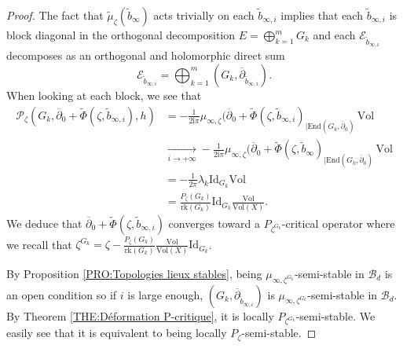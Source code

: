 \documentclass{article}
\theoremstyle{remark}
\theoremstyle{definition}
\newcommand{\tend}[2]{\underset{#1 \rightarrow #2}{\longrightarrow}}
\newcommand{\rk}{\mathrm{rk}}
\newcommand{\End}{\mathrm{End}}
\newcommand{\Vol}{\mathrm{Vol}}
\newcommand{\Id}{\mathrm{Id}}
\renewcommand{\i}{\boldsymbol{\mathrm{i}}}
\newcommand{\E}{\mathcal{E}}
\newcommand{\mB}{\mathcal{B}}
\newcommand{\mP}{\mathcal{P}}
\newcommand{\dbar}{\overline{\partial}}
\begin{document}
\begin{proof}
The fact that $\tilde{\mu}_\zeta(\tilde{b}_\infty)$ acts trivially on each $\tilde{b}_{\infty,i}$ implies that each $\tilde{b}_{\infty,i}$ is block diagonal in the orthogonal decomposition $E = \bigoplus_{k = 1}^m G_k$ and each $\E_{\tilde{b}_{\infty,i}}$ decomposes as an orthogonal and holomorphic direct sum
$$
\E_{\tilde{b}_{\infty,i}} = \bigoplus_{k = 1}^m (G_k,\dbar_{\tilde{b}_{\infty,i}}).
$$
When looking at each block, we see that
\begin{align*}
    \mP_\zeta(G_k,\dbar_0 + \tilde{\Phi}(\zeta,\tilde{b}_{\infty,i}),h) & = -\frac{1}{2\i\pi}\mu_{\infty,\zeta}(\dbar_0 + \tilde{\Phi}(\zeta,\tilde{b}_{\infty,i})_{|\End(G_k,\dbar_0)}\,\Vol\\
    & \tend{i}{+\infty} -\frac{1}{2\i\pi}\mu_{\infty,\zeta}(\dbar_0 + \tilde{\Phi}(\zeta,\tilde{b}_{\infty})_{|\End(G_k,\dbar_0)}\,\Vol\\
    & = -\frac{1}{2\pi}\lambda_k\Id_{G_k}\Vol\\
    & = \frac{P_\zeta(G_k)}{\rk(G_k)}\Id_{G_k}\frac{\Vol}{\Vol(X)}.
\end{align*}
We deduce that $\dbar_0 + \tilde{\Phi}(\zeta,\tilde{b}_{\infty,i})$ converges toward a $P_{\zeta^{G_k}}$-critical operator where we recall that $\zeta^{G_k} = \zeta - \frac{P_\zeta(G_k)}{\rk(G_k)}\frac{\Vol}{\Vol(X)}\Id_{G_k}$.

By Proposition \ref{PRO:Topologies lieux stables}, being $\mu_{\infty,\zeta^{G_k}}$-semi-stable in $\mB_d$ is an open condition so if $i$ is large enough, $(G_k,\dbar_{\tilde{b}_{\infty,i}})$ is $\mu_{\infty,\zeta^{G_k}}$-semi-stable in $\mB_d$. By Theorem \ref{THE:Déformation P-critique}, it is locally $P_{\zeta^{G_k}}$-semi-stable. We easily see that it is equivalent to being locally $P_\zeta$-semi-stable.


\end{proof}
\end{document}
